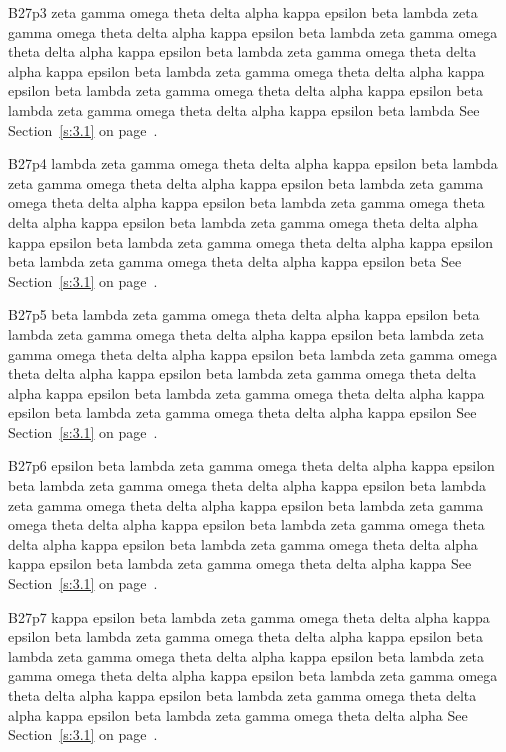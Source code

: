 B27p3 zeta gamma omega theta delta alpha kappa epsilon beta lambda zeta gamma omega theta delta alpha kappa epsilon beta lambda zeta gamma omega theta delta alpha kappa epsilon beta lambda zeta gamma omega theta delta alpha kappa epsilon beta lambda zeta gamma omega theta delta alpha kappa epsilon beta lambda zeta gamma omega theta delta alpha kappa epsilon beta lambda zeta gamma omega theta delta alpha kappa epsilon beta lambda See Section~\ref{s:3.1} on page~\pageref{s:3.1}.

B27p4 lambda zeta gamma omega theta delta alpha kappa epsilon beta lambda zeta gamma omega theta delta alpha kappa epsilon beta lambda zeta gamma omega theta delta alpha kappa epsilon beta lambda zeta gamma omega theta delta alpha kappa epsilon beta lambda zeta gamma omega theta delta alpha kappa epsilon beta lambda zeta gamma omega theta delta alpha kappa epsilon beta lambda zeta gamma omega theta delta alpha kappa epsilon beta See Section~\ref{s:3.1} on page~\pageref{s:3.1}.

B27p5 beta lambda zeta gamma omega theta delta alpha kappa epsilon beta lambda zeta gamma omega theta delta alpha kappa epsilon beta lambda zeta gamma omega theta delta alpha kappa epsilon beta lambda zeta gamma omega theta delta alpha kappa epsilon beta lambda zeta gamma omega theta delta alpha kappa epsilon beta lambda zeta gamma omega theta delta alpha kappa epsilon beta lambda zeta gamma omega theta delta alpha kappa epsilon See Section~\ref{s:3.1} on page~\pageref{s:3.1}.

B27p6 epsilon beta lambda zeta gamma omega theta delta alpha kappa epsilon beta lambda zeta gamma omega theta delta alpha kappa epsilon beta lambda zeta gamma omega theta delta alpha kappa epsilon beta lambda zeta gamma omega theta delta alpha kappa epsilon beta lambda zeta gamma omega theta delta alpha kappa epsilon beta lambda zeta gamma omega theta delta alpha kappa epsilon beta lambda zeta gamma omega theta delta alpha kappa See Section~\ref{s:3.1} on page~\pageref{s:3.1}.

B27p7 kappa epsilon beta lambda zeta gamma omega theta delta alpha kappa epsilon beta lambda zeta gamma omega theta delta alpha kappa epsilon beta lambda zeta gamma omega theta delta alpha kappa epsilon beta lambda zeta gamma omega theta delta alpha kappa epsilon beta lambda zeta gamma omega theta delta alpha kappa epsilon beta lambda zeta gamma omega theta delta alpha kappa epsilon beta lambda zeta gamma omega theta delta alpha See Section~\ref{s:3.1} on page~\pageref{s:3.1}.

